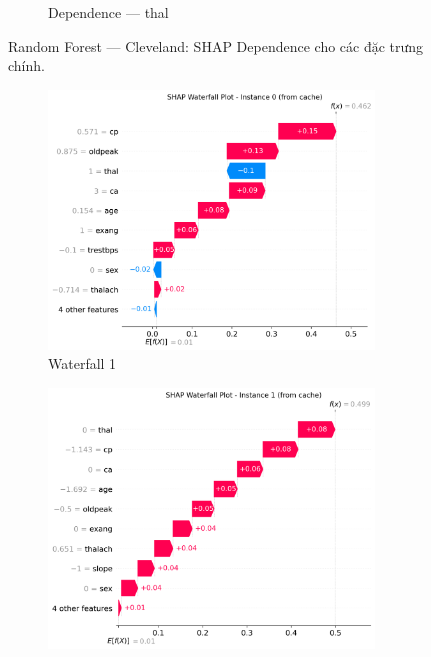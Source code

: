 \begin{figure}[H]
\begin{subfigure}[b]{0.31\textwidth}
\caption{Dependence — thal}
\label{fig:rf_clev_dep_thal}
\end{subfigure}
\caption{Random Forest — Cleveland: SHAP Dependence cho các đặc trưng chính.}
\label{fig:rf_clev_dependences}
\end{figure}

\begin{figure}[H]
\centering
\begin{subfigure}[b]{0.31\textwidth}
\centering
\includegraphics[width=0.95\textwidth]{Result/cleveland_dataset/RF/SHAP/Waterfall 1.png}
\caption{Waterfall 1}
\label{fig:rf_clev_waterfall1}
\end{subfigure}\hfill
\begin{subfigure}[b]{0.31\textwidth}
\centering
\includegraphics[width=0.95\textwidth]{Result/cleveland_dataset/RF/SHAP/Waterfall 2.png}

\end{subfigure}
\end{figure}

